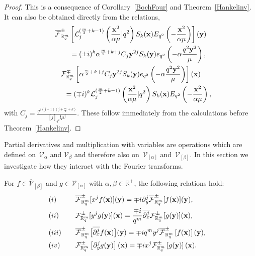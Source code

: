 \documentclass[pdftex]{sigma}
\newcommand{\mR}{\mathbb{R}}
\newcommand{\cF}{\mathcal{F}}
\newcommand{\cL}{\mathcal{L}}
\newcommand{\cV}{\mathcal{V}}
\numberwithin{equation}{section}
\begin{document}
\begin{proof}
This is a consequence of Corollary~\ref{BochFour} and Theorem~\ref{Hankelinv}. It can also be obtained directly from the relations,
\begin{gather*}
\overline{\cF}^{\pm}_{\mR^m_q}\left[\cL_j^{(\frac{m}{2}+k-1)}\left(\frac{\bold{x}^2}{\alpha\mu}|q^2\right)
S_k(\bold{x})E_{q^2}\left(-\frac{\bold{x}^2}{\alpha\mu}\right)\right](\bold{y})\\
 \qquad{} = (\pm i)^k\alpha^{\frac{m}{2}+k+j}C_j\bold{y}^{2j}S_k(\bold{y})e_{q^2}\left(-\alpha\frac{q^2\bold{y}^2}{\mu}\right),\\
\cF^{\mp}_{\mR^m_q}\left[\alpha^{\frac{m}{2}+k+j}C_j\bold{y}^{2j}S_k(\bold{y})e_{q^2}\left(-\alpha\frac{q^2\bold{y}^2}{\mu}\right)\right](\bold{x})\\
 \qquad{} = (\mp i)^k\cL_j^{(\frac{m}{2}+k-1)}\left(\frac{\bold{x}^2}{\alpha\mu}|q^2\right)S_k(\bold{x})E_{q^2}\left(-\frac{\bold{x}^2}{\alpha\mu}\right),
\end{gather*}
with $C_j=\frac{q^{2(j+1)(j+\frac{m}{2}+k)}}{[j]_{q^2}!\mu^j}$. These follow immediately from the calculations before Theorem~\ref{Hankelinv}.
\end{proof}


Partial derivatives and multiplication with variables are operations which are def\/ined on~$\cV_\alpha$ and $\cV_{\beta}$ and therefore also on~$\cV_{[\alpha]}$ and~$\cV_{[\beta]}$. In this section we investigate how they interact with the Fourier transforms.

\begin{theorem}
\label{Fourierx}
For $f\in\overline{\cV}_{[\beta]}$ and $g\in\cV_{[\alpha]}$ with $\alpha,\beta\in\mR^+$, the following relations hold:
\begin{alignat*}{3}
&(i) && \overline{\cF}_{\mR_q^m}^{\pm}[x^jf(\bold{x})](\bold{y}) = \mp i\partial_y^j\overline{\cF}_{\mR_q^m}^{\pm}[f(\bold{x})](\bold{y}),& \\
&(ii) & &\cF^{\pm}_{\mR_q^m}[y^jg(\bold{y})](\bold{x}) = \frac{\mp i}{q^m}\overline{\partial_x^j}\cF^{\pm}_{\mR_q^m}[g(\bold{y})](\bold{x}),& \\
&(iii)\quad &&\overline{\cF}^{\pm}_{\mR^m_q}\big[\overline{\partial^j_x}f(\bold{x})\big](\bold{y}) = \mp iq^my^j\overline{\cF}^{\pm}_{\mR^m_q}\left[f(\bold{x})\right](\bold{y}),& \\
&(iv)&& \cF^{\pm}_{\mR^m_q}\left[\partial^j_yg(\bold{y})\right](\bold{x}) = \mp ix^j\cF^{\pm}_{\mR^m_q}\left[g(\bold{y})\right](\bold{x}).&
\end{alignat*}
\end{theorem}
\end{document}
